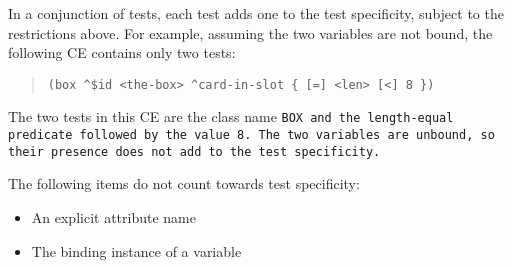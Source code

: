 In a conjunction of tests, each test adds one to the test specificity,
subject to the restrictions above. For example, assuming the two
variables are not bound, the following CE contains only two tests:
\begin{quote}
\begin{verbatim}
(box ^$id <the-box> ^card-in-slot { [=] <len> [<] 8 })
\end{verbatim}
\end{quote}
The two tests in this CE are the class name \tt{BOX} and the
length-equal predicate followed by the value 8. The two variables are
unbound, so their presence does not add to the test specificity.
\begin{note}
  The following items do not count towards test specificity:
  \begin{itemize}
  \item An explicit attribute name
  \item The binding instance of a variable
  \end{itemize}
\end{note}

